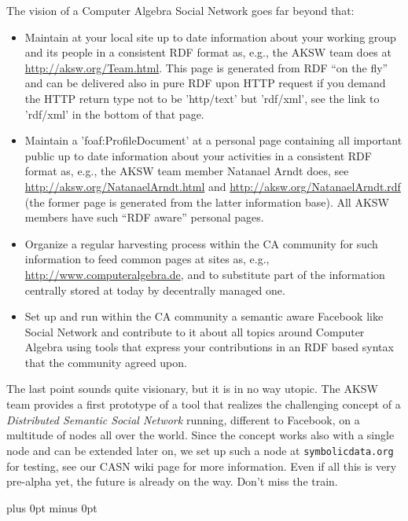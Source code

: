 \documentclass[a4paper,11pt]{article}
\begin{document}
\begin{multicols}{2}
The vision of a Computer Algebra Social Network goes far beyond that: 
\begin{itemize}
\item Maintain at your local site up to date information about your working
  group and its people in a consistent RDF format as, e.g., the AKSW team does
  at \url{http://aksw.org/Team.html}.  This page is generated from RDF ``on the
  fly'' and can be delivered also in pure RDF upon HTTP request if you demand
  the HTTP return type not to be 'http/text' but 'rdf/xml', see the link to
  'rdf/xml' in the bottom of that page.
\item Maintain a 'foaf:ProfileDocument' at a personal page containing all
  important public up to date information about your activities in a consistent
  RDF format as, e.g., the AKSW team member Natanael Arndt does, see
  \url{http://aksw.org/NatanaelArndt.html} and
  \url{http://aksw.org/NatanaelArndt.rdf} (the former page is generated from
  the latter information base).  All AKSW members have such ``RDF aware''
  personal pages.
\item Organize a regular harvesting process within the CA community for such
  information to feed common pages at sites as, e.g.,
  \url{http://www.computeralgebra.de}, and to substitute part of the
  information centrally stored at {\SD} today by decentrally managed one.
\item Set up and run within the CA community a semantic aware Facebook like
  Social Network and contribute to it about all topics around Computer Algebra
  using tools that express your contributions in an RDF based syntax that the
  community agreed upon.
\end{itemize}
The last point sounds quite visionary, but it is in no way utopic. The AKSW
team provides a first prototype of a tool that realizes the challenging concept
of a \emph{Distributed Semantic Social Network} \cite{dssn} running, different
to Facebook, on a multitude of nodes all over the world.  Since the concept
works also with a single node and can be extended later on, we set up such a
node at \texttt{symbolicdata.org} for testing, see our CASN wiki page for more
information.  Even if all this is very pre-alpha yet, the future is already on
the way. Don't miss the train.



\begin{thebibliography}{1}
\itemsep=0cm plus 0pt minus 0pt


\end{thebibliography}
\end{multicols}
\end{document}
